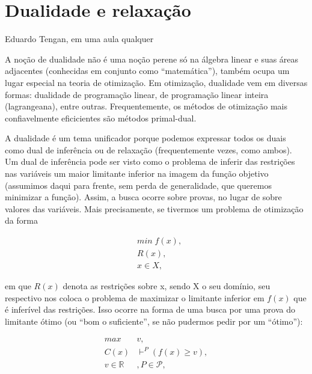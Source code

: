 
%


%

\section{Dualidade e relaxação}

\epigraph{}{Eduardo Tengan, em uma aula qualquer}

A noção de dualidade não é uma noção perene só na álgebra linear e suas áreas adjacentes (conhecidas
em conjunto como ``matemática''), também ocupa um lugar especial na teoria de otimização. Em
otimização, dualidade vem em diversas formas: dualidade de programação linear, de programação
linear inteira (lagrangeana), entre outras. Frequentemente, os métodos de otimização mais
confiavelmente eficicientes são métodos primal-dual.

A dualidade é um tema unificador porque podemos expressar todos os duais como dual de inferência ou
de relaxação (frequentemente vezes, como ambos). Um dual de inferência pode ser visto como o
problema de inferir das restrições nas variáveis um maior limitante inferior na imagem da função
objetivo (assumimos daqui para frente, sem perda de generalidade, que queremos minimizar a função). Assim, a busca ocorre
sobre provas, no lugar de sobre valores das variáveis. Mais precisamente, se tivermos um problema de
otimização da forma

\begin{align*}
  &  min \; f(x),\\
  &  R(x),\\
  &  x \in X,
\end{align*}

\noindent em que $R(x)$ denota as restrições sobre x, sendo X o seu domínio, seu respectivo
 nos coloca o problema de maximizar o limitante inferior em $f(x)$ que
é inferível das restrições. Isso ocorre na forma de uma busca por uma prova do limitante ótimo (ou
``bom o suficiente'', se não pudermos pedir por um ``ótimo''):

\begin{align*}
  max \; & v,\\
  C(x) & \vdash^{P} (f(x) \geq v),\\
  v \in \mathbb{R}&, P \in \mathcal{P},
\end{align*}

